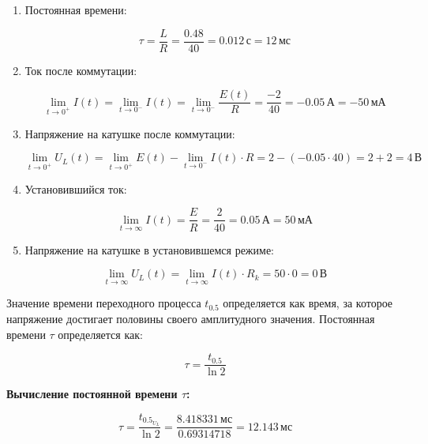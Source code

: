 \begin{enumerate}
	\item Постоянная времени:

	      \[
		      \tau = \frac{L}{R} = \frac{0.48}{40} = 0.012 \, \text{с} = 12 \, \text{мс}
	      \]

	\item Ток после коммутации:

	      \[
		      \lim_{t \to 0^+} I(t) = \lim_{t \to 0^-} I(t) = \lim_{t \to 0^-} \frac{E(t)}{R} = \frac{-2}{40} = -0.05 \, \text{А} = -50 \, \text{мА}
	      \]

	\item Напряжение на катушке после коммутации:

	      \[
		      \lim_{t \to 0^+} U_L(t) = \lim_{t \to 0^+} E(t) - \lim_{t \to 0^-} I(t) \cdot R = 2 - (-0.05 \cdot 40) = 2 + 2 = 4 \, \text{В}
	      \]

	\item Установившийся ток:

	      \[
		      \lim_{t \to \infty} I(t) = \frac{E}{R} = \frac{2}{40} = 0.05 \, \text{А} = 50 \, \text{мА}
	      \]

	\item Напряжение на катушке в установившемся режиме:

	      \[
		      \lim_{t \to \infty} U_L(t) = \lim_{t \to \infty} I(t) \cdot R_k = 50 \cdot 0 = 0 \, \text{В}
	      \]
\end{enumerate}

Значение времени переходного процесса \( t_{0.5} \) определяется как время, за которое напряжение достигает половины своего амплитудного значения. Постоянная времени \( \tau \) определяется как:

\[
	\tau = \frac{t_{0.5}}{\ln 2}
\]

\textbf{Вычисление постоянной времени \( \tau \):}

\[
	\tau = \frac{t_{0.5_{U_L}}}{\ln 2} = \frac{8.418331 \, \text{мс}}{0.69314718} = 12.143 \, \text{мс}
\]
